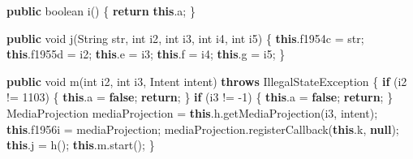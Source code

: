 \documentclass[
]{article}
\newenvironment{Shaded}{}{}
\newcommand{\BuiltInTok}[1]{\textcolor[rgb]{0.00,0.50,0.00}{#1}}
\newcommand{\ControlFlowTok}[1]{\textcolor[rgb]{0.00,0.44,0.13}{\textbf{#1}}}
\newcommand{\DataTypeTok}[1]{\textcolor[rgb]{0.56,0.13,0.00}{#1}}
\newcommand{\DecValTok}[1]{\textcolor[rgb]{0.25,0.63,0.44}{#1}}
\newcommand{\FunctionTok}[1]{\textcolor[rgb]{0.02,0.16,0.49}{#1}}
\newcommand{\KeywordTok}[1]{\textcolor[rgb]{0.00,0.44,0.13}{\textbf{#1}}}
\newcommand{\NormalTok}[1]{#1}
\newcommand{\OperatorTok}[1]{\textcolor[rgb]{0.40,0.40,0.40}{#1}}
\begin{document}
\begin{Shaded}
\begin{Highlighting}[]
    \KeywordTok{public} \DataTypeTok{boolean} \FunctionTok{i}\OperatorTok{()} \OperatorTok{\{}
        \ControlFlowTok{return} \KeywordTok{this}\OperatorTok{.}\FunctionTok{a}\OperatorTok{;}
    \OperatorTok{\}}

    \KeywordTok{public} \DataTypeTok{void} \FunctionTok{j}\OperatorTok{(}\BuiltInTok{String}\NormalTok{ str}\OperatorTok{,} \DataTypeTok{int}\NormalTok{ i2}\OperatorTok{,} \DataTypeTok{int}\NormalTok{ i3}\OperatorTok{,} \DataTypeTok{int}\NormalTok{ i4}\OperatorTok{,} \DataTypeTok{int}\NormalTok{ i5}\OperatorTok{)} \OperatorTok{\{}
        \KeywordTok{this}\OperatorTok{.}\FunctionTok{f1954c} \OperatorTok{=}\NormalTok{ str}\OperatorTok{;}
        \KeywordTok{this}\OperatorTok{.}\FunctionTok{f1955d} \OperatorTok{=}\NormalTok{ i2}\OperatorTok{;}
        \KeywordTok{this}\OperatorTok{.}\FunctionTok{e} \OperatorTok{=}\NormalTok{ i3}\OperatorTok{;}
        \KeywordTok{this}\OperatorTok{.}\FunctionTok{f} \OperatorTok{=}\NormalTok{ i4}\OperatorTok{;}
        \KeywordTok{this}\OperatorTok{.}\FunctionTok{g} \OperatorTok{=}\NormalTok{ i5}\OperatorTok{;}
    \OperatorTok{\}}

    \KeywordTok{public} \DataTypeTok{void} \FunctionTok{m}\OperatorTok{(}\DataTypeTok{int}\NormalTok{ i2}\OperatorTok{,} \DataTypeTok{int}\NormalTok{ i3}\OperatorTok{,}\NormalTok{ Intent intent}\OperatorTok{)} \KeywordTok{throws} \BuiltInTok{IllegalStateException} \OperatorTok{\{}
        \ControlFlowTok{if} \OperatorTok{(}\NormalTok{i2 }\OperatorTok{!=} \DecValTok{1103}\OperatorTok{)} \OperatorTok{\{}
            \KeywordTok{this}\OperatorTok{.}\FunctionTok{a} \OperatorTok{=} \KeywordTok{false}\OperatorTok{;}
            \ControlFlowTok{return}\OperatorTok{;}
        \OperatorTok{\}}
        \ControlFlowTok{if} \OperatorTok{(}\NormalTok{i3 }\OperatorTok{!=} \OperatorTok{{-}}\DecValTok{1}\OperatorTok{)} \OperatorTok{\{}
            \KeywordTok{this}\OperatorTok{.}\FunctionTok{a} \OperatorTok{=} \KeywordTok{false}\OperatorTok{;}
            \ControlFlowTok{return}\OperatorTok{;}
        \OperatorTok{\}}
\NormalTok{        MediaProjection mediaProjection }\OperatorTok{=} \KeywordTok{this}\OperatorTok{.}\FunctionTok{h}\OperatorTok{.}\FunctionTok{getMediaProjection}\OperatorTok{(}\NormalTok{i3}\OperatorTok{,}\NormalTok{ intent}\OperatorTok{);}
        \KeywordTok{this}\OperatorTok{.}\FunctionTok{f1956i} \OperatorTok{=}\NormalTok{ mediaProjection}\OperatorTok{;}
\NormalTok{        mediaProjection}\OperatorTok{.}\FunctionTok{registerCallback}\OperatorTok{(}\KeywordTok{this}\OperatorTok{.}\FunctionTok{k}\OperatorTok{,} \KeywordTok{null}\OperatorTok{);}
        \KeywordTok{this}\OperatorTok{.}\FunctionTok{j} \OperatorTok{=} \FunctionTok{h}\OperatorTok{();}
        \KeywordTok{this}\OperatorTok{.}\FunctionTok{m}\OperatorTok{.}\FunctionTok{start}\OperatorTok{();}
    \OperatorTok{\}}


\end{Highlighting}
\end{Shaded}
\end{document}
